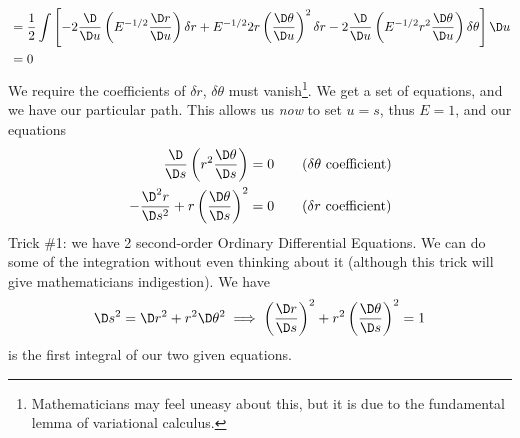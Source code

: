 \begin{ex}[$\RR^2$ revisited]
\begin{align}
&=\frac{1}{2}\int\left[
-2\frac{\D}{\D u}\left(E^{-1/2}\frac{\D r}{\D u}\right)\delta r+
E^{-1/2}2r\left(\frac{\D\theta}{\D u}\right)^{2}\delta r-
2\frac{\D}{\D u}\left(E^{-1/2}r^{2}\frac{\D\theta}{\D u}\right)\delta\theta
\right]\D u\nonumber\\
&=0
\end{align}
We require the coefficients of $\delta r$, $\delta\theta$ must
vanish\footnote{Mathematicians may feel uneasy about this, but it is due to the fundamental lemma of variational calculus.}.
We get a set of equations, and we have our particular path. This
allows us \emph{now} to set $u=s$, thus $E=1$, and our equations
\begin{align*}
\frac{\D}{\D s}\left(r^{2}\frac{\D\theta}{\D s}\right)
&=0\tag{$\delta\theta$\text{ coefficient}}\\
-\frac{\D^{2}r}{\D s^{2}}+r\left(\frac{\D\theta}{\D s}\right)^{2}
&=0\tag{$\delta r$\text{ coefficient}}
\end{align*}
Trick \#1: we have 2 second-order Ordinary Differential
Equations. We can do some of the integration without even
thinking about it (although this trick will give mathematicians
indigestion). We have
\begin{equation}\label{eq:ex01:firstInt}
\D s^2=\D r^2+r^2\D\theta^2\implies
\left(\frac{\D r}{\D s}\right)^{2}+r^{2}\left(
\frac{\D\theta}{\D s}\right)^{2}=1
\end{equation}
is the first integral of our two given equations.


\end{ex}
